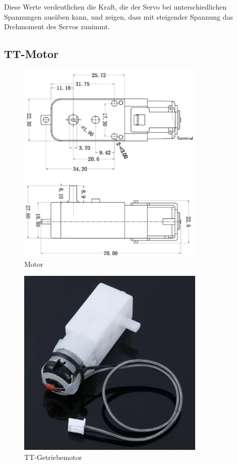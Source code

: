 \documentclass{vorlage-design-main}
\begin{document}
Diese Werte verdeutlichen die Kraft, die der Servo bei unterschiedlichen
Spannungen ausüben kann, und zeigen, dass mit steigender Spannung das
Drehmoment des Servos zunimmt.

\hypertarget{tt-motor}{%
\subsection{TT-Motor}\label{tt-motor}}

\begin{figure}
\centering
\includegraphics[width=0.8\textwidth]{images/motor_size.pdf}
\floatnotes{}
\caption{Motor}
\end{figure}

\begin{figure}
\centering
\includegraphics[width=0.8\textwidth]{images/tt_motor_xh.pdf}
\floatnotes{}
\caption{TT-Getriebemotor}
\end{figure}
\end{document}

